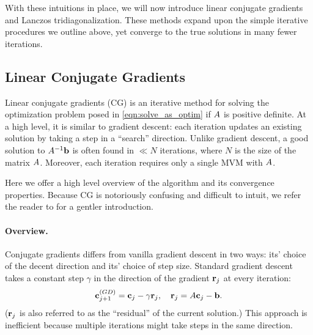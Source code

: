 With these intuitions in place, we will now introduce linear conjugate gradients and Lanczos tridiagonalization.
These methods expand upon the simple iterative procedures we outline above, yet converge to the true solutions in many fewer iterations.



\subsection{Linear Conjugate Gradients}
\label{sec:cg}

Linear conjugate gradients (CG) \cite{hestenes1952methods} is an iterative method for solving the optimization problem posed in \cref{eqn:solve_as_optim} if $A$ is positive definite.
At a high level, it is similar to gradient descent: each iteration updates an existing solution by taking a step in a ``search'' direction.
Unlike gradient descent, a good solution to $A^{-1} \mathbf{b}$ is often found in $\ll N$ iterations, where $N$ is the size of the matrix $A$.
Moreover, each iteration requires only a single MVM with $A$.

Here we offer a high level overview of the algorithm and its convergence properties.
Because CG is notoriously confusing and difficult to intuit, we refer the reader to \citet{shewchuk1994introduction} for a gentler introduction.

\paragraph{Overview.}
Conjugate gradients differs from vanilla gradient descent in two ways: its' choice of the decent direction and its' choice of step size.
Standard gradient descent takes a constant step $\gamma$ in the direction of the gradient $\mathbf{r}_j$ at every iteration:
%
\begin{equation*}
  \mathbf{c}_{j+1}^{\text(GD)} = \mathbf{c}_{j} - \gamma \mathbf{r}_{j}, \quad
  \mathbf{r}_{j} = A \mathbf{c}_{j} - \mathbf{b}.
\end{equation*}
%
($\mathbf{r}_j$ is also referred to as the ``residual'' of the current solution.)
This approach is inefficient because multiple iterations might take steps in the same direction.


